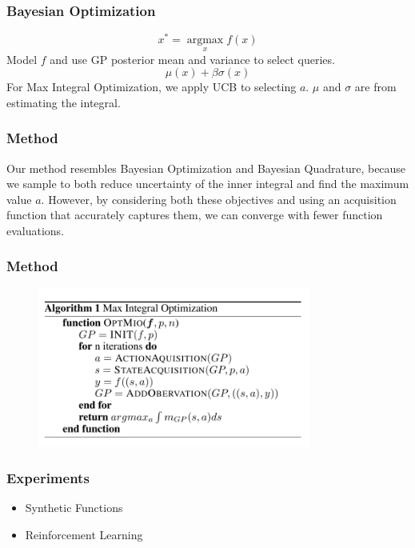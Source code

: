 \documentclass[11pt]{beamer}
\begin{document}
\begin{frame}
\frametitle{Bayesian Optimization}
\begin{equation*}
x^{*} = \operatorname*{argmax}_{x} f(x)
\end{equation*}
Model $f$ and use GP posterior mean and variance to select queries.
\begin{equation*}
\mu(x) + \beta \sigma (x)
\end{equation*}
For Max Integral Optimization, we apply UCB to selecting $a$.   
\newline \newline
$\mu$ and $\sigma$ are from estimating the integral.
\end{frame}

\begin{frame}
\frametitle{Method}
Our method resembles Bayesian Optimization and Bayesian Quadrature, because we sample to both reduce uncertainty of the inner integral and find the maximum value $a$.
\newline \newline
However, by considering both these objectives and using an acquisition function that accurately captures them, we can converge with fewer function evaluations.
\end{frame}

\begin{frame}
\frametitle{Method}
\begin{figure}
	\includegraphics[width=0.8\textwidth]{alg2}
\end{figure}
\end{frame}


\begin{frame}
\frametitle{Experiments}
\begin{itemize}
	\item Synthetic Functions
	\item Reinforcement Learning
\end{itemize}
\end{frame}
\end{document}
